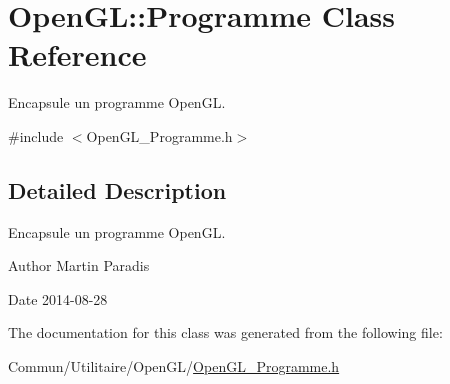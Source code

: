 \hypertarget{class_open_g_l_1_1_programme}{}\section{Open\+GL\+:\+:Programme Class Reference}
\label{class_open_g_l_1_1_programme}


Encapsule un programme Open\+GL.  




{\ttfamily \#include $<$Open\+G\+L\+\_\+\+Programme.\+h$>$}



\subsection{Detailed Description}
Encapsule un programme Open\+GL. 

\begin{DoxyAuthor}{Author}
Martin Paradis 
\end{DoxyAuthor}
\begin{DoxyDate}{Date}
2014-\/08-\/28 
\end{DoxyDate}


The documentation for this class was generated from the following file\+:\begin{DoxyCompactItemize}
\item 
Commun/\+Utilitaire/\+Open\+G\+L/\hyperlink{_open_g_l___programme_8h}{Open\+G\+L\+\_\+\+Programme.\+h}\end{DoxyCompactItemize}
